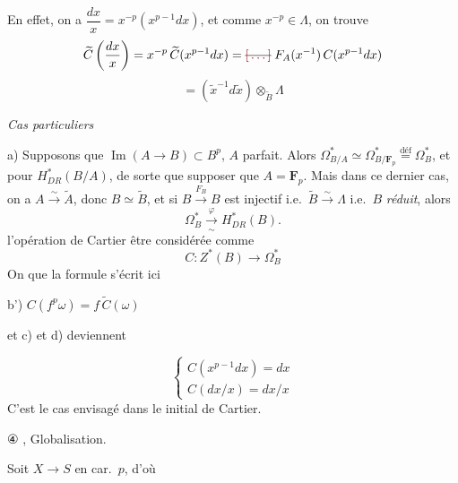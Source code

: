 \documentclass[11pt,a4paper]{article}
\begin{document}
En effet, on a $\dfrac{dx}{x} = x^{-p}(x^{p-1}dx)$, et comme $x^{-p} \in \Lambda$, on trouve
\[
\widetilde{C}\left(\frac{dx}{x}\right) = x^{-p}\,\widetilde{C}(x^{p-1}dx) = \text{\struck{$\ill{}$}}\; F_{A}(x^{-1})\,C(x^{p-1}dx)
\]
\[
= (\widetilde{x}^{-1}d\widetilde{x}) \otimes_{\widetilde{B}} \Lambda
\]

\emph{Cas particuliers}

a) Supposons que $\operatorname{Im}(A \to B) \subset B^{p}$,    $A$ parfait. Alors $\Omega^{*}_{B/A} \simeq \Omega^{*}_{B/\mathbf{F}_{p}} \overset{\text{déf}}{=} \Omega^{*}_{B}$, et   pour $H^{*}_{DR}(B/A)$, de sorte que   supposer que $A = \mathbf{F}_{p}$. Mais dans ce dernier cas, on a $A \xrightarrow{\sim} \widetilde{A}$, donc $B \simeq \widetilde{B}$, et si $B \xrightarrow{F_{B}} B$ est injectif i.e.\ $\widetilde{B} \xrightarrow{\sim} \Lambda$ i.e.\ $B$ \emph{réduit}, alors    
\[
\Omega^{*}_{B} \xrightarrow[\sim]{\varphi} H^{*}_{DR}(B) .
\]
 l'opération de Cartier  être considérée  comme
\[
C : Z^{*}(B) \to \Omega^{*}_{B}
\]
On   que la  formule s'écrit ici

b') \qquad $C(f^{p}\omega) = f\,\widetilde{C}(\omega)$

et c) et d) deviennent

\[
\begin{cases} C(x^{p-1}dx) = dx \\ C(dx/x) = dx/x \end{cases}
\]
C'est le cas envisagé dans le  initial de Cartier.

④ , Globalisation.

Soit $X \to S$ en car.\ $p$, d'où

\end{document}
